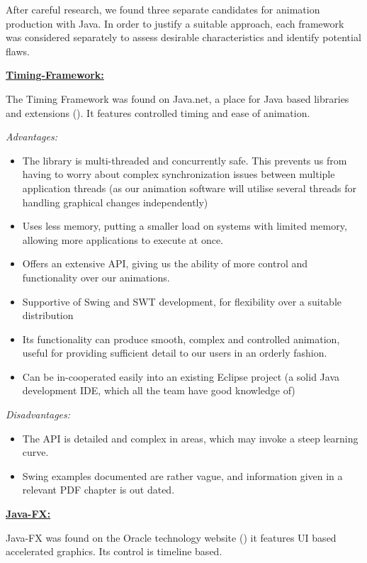 \documentclass{l3proj}
\begin{document}
After careful research, we found three separate candidates for animation production with Java. In order to justify a suitable approach, each framework was considered separately to assess desirable characteristics and identify potential flaws. 

\underline{\textbf{Timing-Framework:}}

The Timing Framework was found on Java.net, a place for Java based libraries and extensions (\cite{website:TimingFramework}). It features controlled timing and ease of animation.

\textit{Advantages:}
\begin{itemize}
	\item The library is multi-threaded and concurrently safe. This prevents us from having to worry about complex synchronization issues between multiple application threads (as our animation software will utilise several threads for handling graphical changes independently)
	\item Uses less memory, putting a smaller load on systems with limited memory, allowing more applications to execute at once. 
	\item Offers an extensive API, giving us the ability of more control and functionality over our animations.
	\item Supportive of Swing and SWT development, for flexibility over a suitable distribution
	\item Its functionality can produce smooth, complex and controlled animation, useful for providing sufficient detail to our users in an orderly fashion.
	\item Can be in-cooperated easily into an existing Eclipse project (a solid Java development IDE, which all the team have good knowledge of)
\end{itemize}

\textit{Disadvantages:}
\begin{itemize}
	\item The API is detailed and complex in areas, which may invoke a steep learning curve.
	\item Swing examples documented are rather vague, and information given in a relevant PDF chapter is out dated.
\end{itemize}

\underline{\textbf{Java-FX:}}

Java-FX was found on the Oracle technology website (\cite{website:JavaFX}) it features UI based accelerated graphics. Its control is timeline based.
\end{document}
